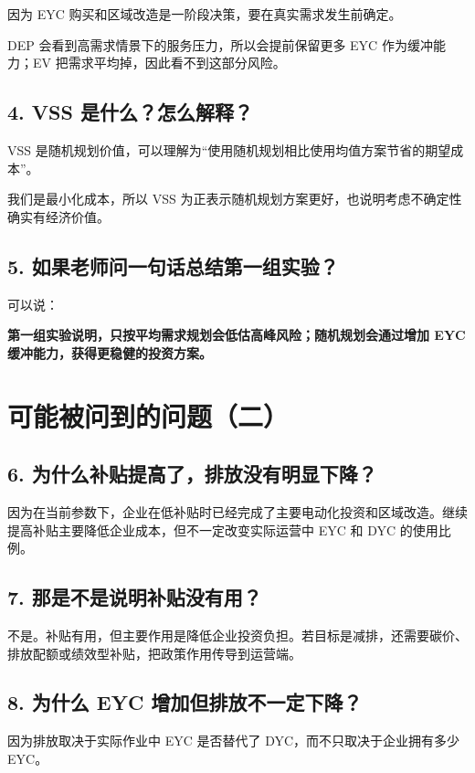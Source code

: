\documentclass[UTF8,zihao=false,12pt]{ctexart}
\begin{document}
因为 EYC 购买和区域改造是一阶段决策，要在真实需求发生前确定。

DEP 会看到高需求情景下的服务压力，所以会提前保留更多 EYC 作为缓冲能力；EV 把需求平均掉，因此看不到这部分风险。

\subsection*{4. VSS 是什么？怎么解释？}

VSS 是随机规划价值，可以理解为“使用随机规划相比使用均值方案节省的期望成本”。

我们是最小化成本，所以 VSS 为正表示随机规划方案更好，也说明考虑不确定性确实有经济价值。

\subsection*{5. 如果老师问一句话总结第一组实验？}

可以说：

\textbf{第一组实验说明，只按平均需求规划会低估高峰风险；随机规划会通过增加 EYC 缓冲能力，获得更稳健的投资方案。}

\newpage

\section*{可能被问到的问题（二）}

\subsection*{6. 为什么补贴提高了，排放没有明显下降？}

因为在当前参数下，企业在低补贴时已经完成了主要电动化投资和区域改造。继续提高补贴主要降低企业成本，但不一定改变实际运营中 EYC 和 DYC 的使用比例。

\subsection*{7. 那是不是说明补贴没有用？}

不是。补贴有用，但主要作用是降低企业投资负担。若目标是减排，还需要碳价、排放配额或绩效型补贴，把政策作用传导到运营端。

\subsection*{8. 为什么 EYC 增加但排放不一定下降？}

因为排放取决于实际作业中 EYC 是否替代了 DYC，而不只取决于企业拥有多少 EYC。
\end{document}
